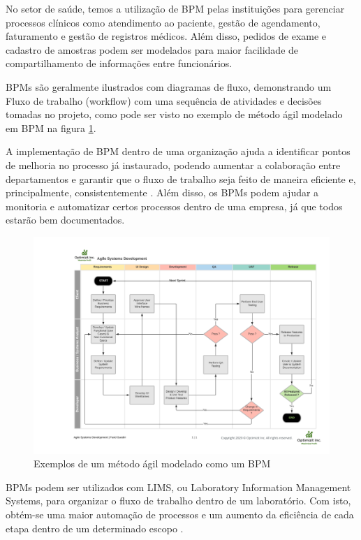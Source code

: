 

No setor de saúde, temos a utilização de BPM pelas instituições para gerenciar processos clínicos como atendimento ao paciente, gestão de agendamento, faturamento e gestão de registros médicos. Além disso, pedidos de exame e cadastro de amostras podem ser modelados para maior facilidade de compartilhamento de informações entre funcionários.


BPMs são geralmente ilustrados com diagramas de fluxo, demonstrando um Fluxo de trabalho (workflow) com uma sequência de atividades e decisões tomadas no projeto, como pode ser visto no exemplo de método ágil modelado em BPM na figura \ref{fig:bpm}.

A implementação de BPM dentro de uma organização ajuda a identificar pontos de melhoria no processo já instaurado, podendo aumentar a colaboração entre departamentos e garantir que o fluxo de trabalho seja feito de maneira eficiente e, principalmente, consistentemente \R.
Além disso, os BPMs podem ajudar a monitoria e automatizar certos processos dentro de uma empresa, já que todos estarão bem documentados. \R

\begin{figure}
    \centering
    \includegraphics[width=1\textwidth]{imgs/BPM/sprint as bpm.png}
    \caption{Exemplos de um método ágil modelado como um BPM}
    \label{fig:bpm}
\end{figure}

BPMs podem ser utilizados com LIMS, ou Laboratory Information Management Systems, para organizar o fluxo de trabalho dentro de um laboratório. Com isto, obtém-se uma maior automação de processos e um aumento da eficiência de cada etapa dentro de um determinado escopo \cite{Key2011LIMS:Systems}.

